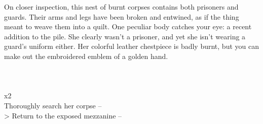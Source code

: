 On closer inspection, this nest of burnt corpses contains both prisoners and guards. Their arms and legs have been broken and entwined, as if the thing meant to weave them into a quilt. One peculiar body catches your eye: a recent addition to the pile. She clearly wasn’t a prisoner, and yet she isn't wearing a guard’s uniform either. Her colorful leather chestpiece is badly burnt, but you can make out the embroidered emblem of a golden hand.\\
\\
\\
\\
 x2\\

 Thoroughly search her corpse -- \\
> Return to the exposed mezzanine -- 